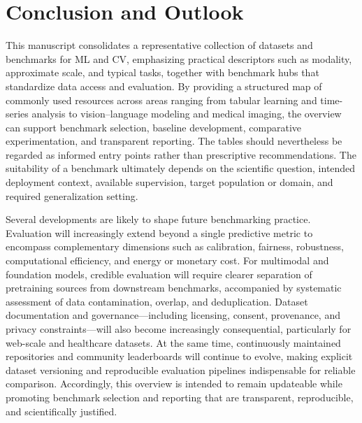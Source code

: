 \documentclass{article}
\newcounter{entry}[section]
\begin{document}
\clearpage




\section{Conclusion and Outlook}

This manuscript consolidates a representative collection of datasets and benchmarks for ML and CV, emphasizing practical descriptors such as modality, approximate scale, and typical tasks, together with benchmark hubs that standardize data access and evaluation. By providing a structured map of commonly used resources across areas ranging from tabular learning and time-series analysis to vision--language modeling and medical imaging, the overview can support benchmark selection, baseline development, comparative experimentation, and transparent reporting. The tables should nevertheless be regarded as informed entry points rather than prescriptive recommendations. The suitability of a benchmark ultimately depends on the scientific question, intended deployment context, available supervision, target population or domain, and required generalization setting.

Several developments are likely to shape future benchmarking practice. Evaluation will increasingly extend beyond a single predictive metric to encompass complementary dimensions such as calibration, fairness, robustness, computational efficiency, and energy or monetary cost. For multimodal and foundation models, credible evaluation will require clearer separation of pretraining sources from downstream benchmarks, accompanied by systematic assessment of data contamination, overlap, and deduplication. Dataset documentation and governance---including licensing, consent, provenance, and privacy constraints---will also become increasingly consequential, particularly for web-scale and healthcare datasets. At the same time, continuously maintained repositories and community leaderboards will continue to evolve, making explicit dataset versioning and reproducible evaluation pipelines indispensable for reliable comparison. Accordingly, this overview is intended to remain updateable while promoting benchmark selection and reporting that are transparent, reproducible, and scientifically justified.




\clearpage






\end{document}
